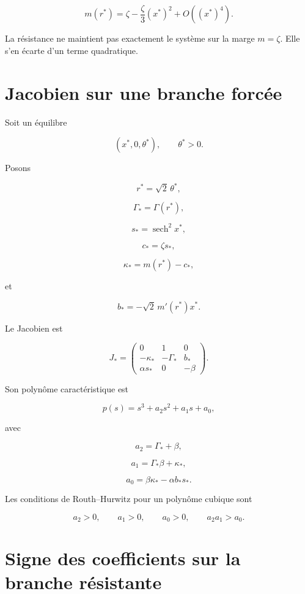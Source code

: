 \[
\boxed{
m(r^\ast)
=
\zeta
-
\frac{\zeta}{3}(x^\ast)^2
+
O\left(
(x^\ast)^4
\right).
}
\]

La résistance ne maintient pas exactement le système sur la marge
\(m=\zeta\). Elle s'en écarte d'un terme quadratique.

\section{Jacobien sur une branche forcée}
\label{annexe-resistance-jacobien}

Soit un équilibre

\[
(x^\ast,0,\theta^\ast),
\qquad
\theta^\ast>0.
\]

Posons

\[
r^\ast=\sqrt2\,\theta^\ast,
\]

\[
\Gamma_\ast=\Gamma(r^\ast),
\]

\[
s_\ast=\operatorname{sech}^2x^\ast,
\]

\[
c_\ast=\zeta s_\ast,
\]

\[
\kappa_\ast
=
m(r^\ast)-c_\ast,
\]

et

\[
b_\ast
=
-\sqrt2\,m'(r^\ast)x^\ast.
\]

Le Jacobien est

\[
\boxed{
J_\ast
=
\begin{pmatrix}
0&1&0\\
-\kappa_\ast&-\Gamma_\ast&b_\ast\\
\alpha s_\ast&0&-\beta
\end{pmatrix}.
}
\]

Son polynôme caractéristique est

\[
p(s)
=
s^3+a_2s^2+a_1s+a_0,
\]

avec

\[
\boxed{
a_2
=
\Gamma_\ast+\beta,
}
\]

\[
\boxed{
a_1
=
\Gamma_\ast\beta+\kappa_\ast,
}
\]

\[
\boxed{
a_0
=
\beta\kappa_\ast
-
\alpha b_\ast s_\ast.
}
\]

Les conditions de Routh--Hurwitz pour un polynôme cubique sont

\[
a_2>0,
\qquad
a_1>0,
\qquad
a_0>0,
\qquad
a_2a_1>a_0.
\]

\section{Signe des coefficients sur la branche résistante}
\label{annexe-resistance-signe-coefficients}


